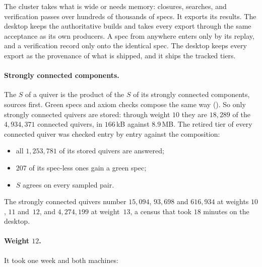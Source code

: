 \documentclass[11pt]{amsart}
\theoremstyle{remark}
\begin{document}
The cluster takes what is wide or needs memory: closures, searches, and
verification passes over hundreds of thousands of specs.  It exports its
results.  The desktop keeps the authoritative builds and takes every export
through the same acceptance as its own producers.  A spec from anywhere
enters only by its replay, and a verification record only onto the
identical spec.  The desktop keeps every export as the provenance of what
is shipped, and it ships the tracked tiers.

\paragraph{Strongly connected components.}  The $S$ of a quiver is the
product of the $S$ of its strongly connected components, sources first.
Green specs and axiom checks compose the same way
().
So only strongly connected quivers are stored: through weight $10$ they are
$18{,}289$ of the $4{,}934{,}371$ connected quivers, in $166$\,kB against
$8.9$\,MB.  The retired tier of every connected quiver was checked
entry by entry against the composition:
\begin{itemize}[leftmargin=*]
  \item all $1{,}253{,}781$ of its stored quivers are answered;
  \item $207$ of its spec-less ones gain a green spec;
  \item $S$ agrees on every sampled pair.
\end{itemize}
The strongly connected quivers number $15{,}094$, $93{,}698$ and
$616{,}934$ at weights $10$, $11$ and~$12$, and $4{,}274{,}199$ at
weight~$13$, a census that took $18$ minutes on the desktop.

\paragraph{Weight $12$.}  It took one week and both machines:
\end{document}
